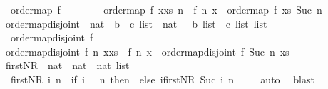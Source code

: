 \begin{isabellebody}
\ \ {\isachardoublequoteopen}order{\isacharunderscore}map\ f\ {\isacharbrackleft}{\isacharbrackright}\ {\isacharunderscore}\ {\isacharequal}\ {\isacharbrackleft}{\isacharbrackright}{\isachardoublequoteclose}\ \ \ \isanewline
{\isacharbar}\ {\isachardoublequoteopen}order{\isacharunderscore}map\ f\ {\isacharparenleft}x{\isacharhash}xs{\isacharparenright}\ n\ {\isacharequal}\ f\ n\ x\ {\isacharat}\ {\isacharparenleft}order{\isacharunderscore}map\ f\ xs\ {\isacharparenleft}Suc\ n{\isacharparenright}{\isacharparenright}{\isachardoublequoteclose}\isanewline
\ \ \isanewline
{}\isamarkupfalse%
\ order{\isacharunderscore}map{\isacharunderscore}disjoint\ {\isacharcolon}{\isacharcolon}\ {\isachardoublequoteopen}{\isacharparenleft}nat\ {\isasymRightarrow}\ {\isacharprime}b\ {\isasymRightarrow}\ {\isacharprime}c\ list{\isacharparenright}\ {\isasymRightarrow}\ nat\ \ {\isasymRightarrow}\ {\isacharprime}b\ list\ {\isasymRightarrow}\ {\isacharparenleft}{\isacharprime}c\ list{\isacharparenright}\ list{\isachardoublequoteclose}\ \isanewline
\ \ {\isachardoublequoteopen}order{\isacharunderscore}map{\isacharunderscore}disjoint\ f\ {\isacharunderscore}\ {\isacharbrackleft}{\isacharbrackright}\ {\isacharequal}\ {\isacharbrackleft}{\isacharbrackright}{\isachardoublequoteclose}\ \ \ \isanewline
{\isacharbar}\ {\isachardoublequoteopen}order{\isacharunderscore}map{\isacharunderscore}disjoint\ f\ n\ {\isacharparenleft}x{\isacharhash}xs{\isacharparenright}\ {\isacharequal}\ f\ n\ x\ {\isacharhash}\ {\isacharparenleft}order{\isacharunderscore}map{\isacharunderscore}disjoint\ f\ {\isacharparenleft}Suc\ n{\isacharparenright}\ xs{\isacharparenright}{\isachardoublequoteclose}\ \isanewline
\isanewline
{}\isamarkupfalse%
\ firstN{\isacharunderscore}R\ {\isacharcolon}{\isacharcolon}\ {\isachardoublequoteopen}nat\ {\isasymRightarrow}\ nat\ {\isasymRightarrow}\ nat\ list{\isachardoublequoteclose}\ \isanewline
\ \ {\isachardoublequoteopen}firstN{\isacharunderscore}R\ i\ n\ {\isacharequal}\ {\isacharparenleft}if\ i\ {\isasymge}\ \ n\ then\ {\isacharbrackleft}{\isacharbrackright}\ else\ i{\isacharhash}{\isacharparenleft}firstN{\isacharunderscore}R\ {\isacharparenleft}Suc\ i{\isacharparenright}\ n{\isacharparenright}{\isacharparenright}{\isachardoublequoteclose}\isanewline
%
\isadelimproof
\ \ \ %
\endisadelimproof
%
\isatagproof
{}\isamarkupfalse%
\ auto{\isacharbrackleft}{}{\isacharbrackright}\ \isamarkupfalse%
\ blast%
\endisatagproof
{\isafoldproof}%
%
\isadelimproof
\isanewline
%

\end{isabellebody}
